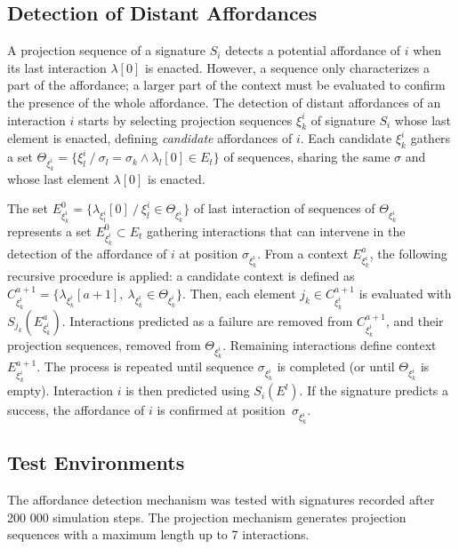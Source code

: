 \documentclass[conference]{IEEEtran}
\begin{document}
\subsection{Detection of Distant Affordances}\label{detection}


A projection sequence of a signature $S_i$ detects a potential affordance of $i$ when its last interaction $\lambda[0]$ is enacted.
However, a sequence only characterizes a part of the affordance; a larger part of the context must be evaluated to confirm the presence of the whole affordance.
The detection of distant affordances of an interaction $i$ starts by selecting projection sequences $\xi_k^i$ of signature $S_i$ whose last element is enacted, defining \textit{candidate} affordances of $i$. Each candidate $\xi_k^i$ gathers a set $\Theta_{\xi_k^i} = \{\xi_l^i ~/~ \sigma_l = \sigma_k \wedge \lambda_l[0] \in E_t\}$ of sequences, sharing the same $\sigma$ and whose last element $\lambda[0]$ is enacted.

The set $E_{\xi_k^i}^0=\{\lambda_{\xi_l^i}[0] ~/~\xi_l^i \in \Theta_{\xi_k^i}\}$ of last interaction of sequences of $\Theta_{\xi_k^i}$ represents a set $E_{\xi_k^i}^0 \subset E_t$ gathering interactions that can intervene in the detection of the affordance of $i$ at position $\sigma_{\xi_k^i}$.
From a context $E_{\xi_k^i}^a$, the following recursive procedure is applied: a candidate context is defined as $C_{\xi_k^i}^{a+1} = \{\lambda_{\xi_k^i}[a+1] ,~ \lambda_{\xi_k^i} \in \Theta_{\xi_k^i} \} $.
Then, each element $j_k \in C_{\xi_k^i}^{a+1}$ is evaluated with $S_{j_k}(E_{\xi_k^i}^a)$.
Interactions predicted as a failure are removed from $C_{\xi_k^i}^{a+1}$, and their projection sequences, removed from $\Theta_{\xi_k^i}$. 
Remaining interactions define context $E_{\xi_k^i}^{a+1}$. 
The process is repeated until sequence $\sigma_{\xi_k^i}$ is completed (or until $\Theta_{\xi_k^i}$ is empty). 
Interaction $i$ is then predicted using $S_i(E^l)$. 
If the signature predicts a success, the affordance of $i$ is confirmed at position~$\sigma_{\xi_k^i}$.


\subsection{Test Environments}\label{test}

The affordance detection mechanism was tested with signatures recorded after 200 000 simulation steps.
The projection mechanism generates projection sequences with a maximum length up to 7 interactions.
\end{document}

